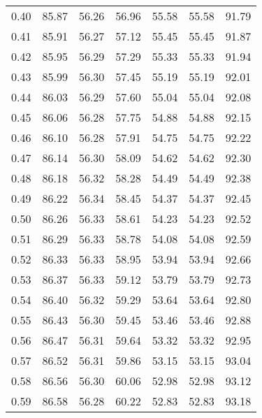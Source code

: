 \begin{tabular}{|c|c|c|c|c|c|c|}
      0.40 &     85.87 &     56.26 &      56.96 &   55.58 &      55.58 &         91.79 \\
      0.41 &     85.91 &     56.27 &      57.12 &   55.45 &      55.45 &         91.87 \\
      0.42 &     85.95 &     56.29 &      57.29 &   55.33 &      55.33 &         91.94 \\
      0.43 &     85.99 &     56.30 &      57.45 &   55.19 &      55.19 &         92.01 \\
      0.44 &     86.03 &     56.29 &      57.60 &   55.04 &      55.04 &         92.08 \\
      0.45 &     86.06 &     56.28 &      57.75 &   54.88 &      54.88 &         92.15 \\
      0.46 &     86.10 &     56.28 &      57.91 &   54.75 &      54.75 &         92.22 \\
      0.47 &     86.14 &     56.30 &      58.09 &   54.62 &      54.62 &         92.30 \\
      0.48 &     86.18 &     56.32 &      58.28 &   54.49 &      54.49 &         92.38 \\
      0.49 &     86.22 &     56.34 &      58.45 &   54.37 &      54.37 &         92.45 \\
      0.50 &     86.26 &     56.33 &      58.61 &   54.23 &      54.23 &         92.52 \\
      0.51 &     86.29 &     56.33 &      58.78 &   54.08 &      54.08 &         92.59 \\
      0.52 &     86.33 &     56.33 &      58.95 &   53.94 &      53.94 &         92.66 \\
      0.53 &     86.37 &     56.33 &      59.12 &   53.79 &      53.79 &         92.73 \\
      0.54 &     86.40 &     56.32 &      59.29 &   53.64 &      53.64 &         92.80 \\
      0.55 &     86.43 &     56.30 &      59.45 &   53.46 &      53.46 &         92.88 \\
      0.56 &     86.47 &     56.31 &      59.64 &   53.32 &      53.32 &         92.95 \\
      0.57 &     86.52 &     56.31 &      59.86 &   53.15 &      53.15 &         93.04 \\
      0.58 &     86.56 &     56.30 &      60.06 &   52.98 &      52.98 &         93.12 \\
      0.59 &     86.58 &     56.28 &      60.22 &   52.83 &      52.83 &         93.18 \\

\end{tabular}
